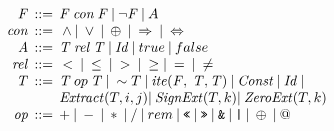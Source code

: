 \documentclass[a4paper]{llncs}
\begin{document}
\[\begin{array}{r@{\:\:}c@{\:\:}l}
\\[-5ex]
\mathit{F}  & ::= & \mathit{F} \: \mathit{con} \: \mathit{F} \:
                    | \: \neg\mathit{F} \:
                    | \: A \\
\mathit{con}  & ::= & \: \wedge \:
                    | \: \vee \:
                    | \: \oplus \:
                    | \: \Rightarrow \:
                    | \: \Leftrightarrow \: \\
\mathit{A} & ::= &  \mathit{T} \: \mathit{rel} \: \mathit{T} \:
                    | \: \mathit{Id} \: | \: true \: | \: false \\
\mathit{rel}  & ::= & \: < \:
                    | \: \leq \:
                    | \: > \:
                    | \: \geq
                    | \: = \:
                    | \: \neq \: \\
\mathit{T}  & ::= &  \mathit{T} \: op \: \mathit{T} \:
                    | \: \sim T \:
                    | \: \mathit{ite}(\mathit{F}, \: \mathit{T}, \mathit{T}) \:
                    | \: \mathit{Const} \:
                    | \: \mathit{Id} \: | \\
              &   & \mathit{Extract}(T, i, j)
                    | \: \mathit{SignExt}(T, k)
                    | \: \mathit{ZeroExt}(T, k) \\
\mathit{op}   & ::= & + \:
                    | \: - \:
                    | \: * \:
                    | \: / \:
                    | \: rem \:
                    | \: \texttt{<<} \:
                    | \: \texttt{>>} \:
                    | \: \texttt{\&} \:
                    | \: \texttt{|} \:
                    | \: \oplus \:
                    | \: @ \:
\end{array}
\]
\end{document}
